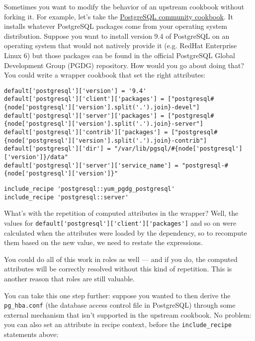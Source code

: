 Sometimes you want to modify the behavior of an upstream cookbook without forking it. For example, let's take the \href{https://supermarket.getchef.com/cookbooks/postgresql}{PostgreSQL community cookbook}. It installs whatever PostgreSQL packages come from your operating system distribution. Suppose you want to install version 9.4 of PostgreSQL on an operating system that would not natively provide it (e.g. RedHat Enterprise Linux 6) but those packages can be found in the official PostgreSQL Global Development Group (PGDG) repository. How would you go about doing that? You could write a wrapper cookbook that set the right attributes:

\begin{lstlisting}[label=lst:wrapper-cookbook3,caption=acmeco-postgresql/attributes/default.rb]
default['postgresql']['version'] = '9.4'
default['postgresql']['client']['packages'] = ["postgresql#{node['postgresql']['version'].split('.').join}-devel"]
default['postgresql']['server']['packages'] = ["postgresql#{node['postgresql']['version'].split('.').join}-server"]
default['postgresql']['contrib']['packages'] = ["postgresql#{node['postgresql']['version'].split('.').join}-contrib"]
default['postgresql']['dir'] = "/var/lib/pgsql/#{node['postgresql']['version']}/data"
default['postgresql']['server']['service_name'] = "postgresql-#{node['postgresql']['version']}"
\end{lstlisting}

\begin{lstlisting}[label=lst:wrapper-cookbook4,caption=acmeco-postgresql/recipes/default.rb]
include_recipe 'postgresql::yum_pgdg_postgresql'
include_recipe 'postgresql::server'
\end{lstlisting}

What's with the repetition of computed attributes in the wrapper? Well, the values for \lstinline!default['postgresql']['client']['packages']! and so on were calculated when the attributes were loaded by the dependency, so to recompute them based on the new value, we need to restate the expressions.

You could do all of this work in roles as well — and if you do, the computed attributes will be correctly resolved without this kind of repetition. This is another reason that roles are still valuable.

You can take this one step further: suppose you wanted to then derive the \lstinline!pg_hba.conf! (the database access control file in PostgreSQL) through some external mechanism that isn't supported in the upstream cookbook. No problem: you can also set an attribute in recipe context, before the \lstinline!include_recipe! statements above:

